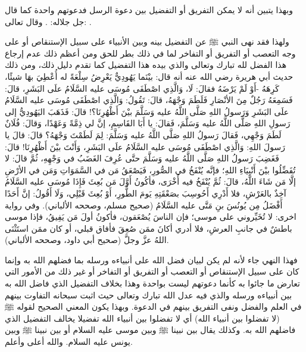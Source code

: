وبهذا يتبين أنه لا يمكن التفريق أو التفضيل بين دعوة الرسل فدعوتهم واحدة كما قال جل جلاله: \quranayah*[2][136]{\footnotesize \surahname*[2]}. وقال تعالى:
\quranayah*[2][285]{\footnotesize \surahname*[2]}.

ولهذا فقد نهى النبي ﷺ عن التفضيل بينه وبين الأنبياء على سبيل الإستنقاص أو على وجه التعصب أو التفريق أو التفاخر لما في ذلك بطر للحق ومن أعظم ذلك عدم إرجاع هذا الفضل لله تبارك وتعالى والذي بيده هذا التفضيل كما تقدم دليل ذلك، ومن ذلك حديث أبي هريرة رضي الله عنه أنه قال: بيْنَما يَهُودِيٌّ يَعْرِضُ سِلْعَةً له أُعْطِيَ بهَا شيئًا، كَرِهَهُ -أَوْ لَمْ يَرْضَهُ فقالَ: لَا، وَالَّذِي اصْطَفَى مُوسَى عليه السَّلَامُ علَى البَشَرِ، قالَ: فَسَمِعَهُ رَجُلٌ مِنَ الأنْصَارِ فَلَطَمَ وَجْهَهُ، قالَ: تَقُولُ: وَالَّذِي اصْطَفَى مُوسَى عليه السَّلَامُ علَى البَشَرِ وَرَسولُ اللهِ صَلَّى اللَّهُ عليه وَسَلَّمَ بيْنَ أَظْهُرِنَا؟! قالَ: فَذَهَبَ اليَهُودِيُّ إلى رَسولِ اللهِ صَلَّى اللَّهُ عليه وَسَلَّمَ، فَقالَ: يا أَبَا القَاسِمِ، إنَّ لي ذِمَّةً وَعَهْدًا، وَقالَ: فُلَانٌ لَطَمَ وَجْهِي، فَقالَ رَسولُ اللهِ صَلَّى اللَّهُ عليه وَسَلَّمَ: لِمَ لَطَمْتَ وَجْهَهُ؟ قالَ: قالَ يا رَسولَ اللهِ: وَالَّذِي اصْطَفَى مُوسَى عليه السَّلَامُ علَى البَشَرِ، وَأَنْتَ بيْنَ أَظْهُرِنَا! قالَ: فَغَضِبَ رَسولُ اللهِ صَلَّى اللَّهُ عليه وَسَلَّمَ حتَّى عُرِفَ الغَضَبُ في وَجْهِهِ، ثُمَّ قالَ: لا تُفَضِّلُوا بيْنَ أَنْبِيَاءِ اللهِ؛ فإنَّه يُنْفَخُ في الصُّورِ، فَيَصْعَقُ مَن في السَّمَوَاتِ وَمَن في الأرْضِ إلَّا مَن شَاءَ اللَّهُ، قالَ: ثُمَّ يُنْفَخُ فيه أُخْرَى، فأكُونُ أَوَّلَ مَن بُعِثَ فَإِذَا مُوسَى عليه السَّلَامُ آخِذٌ بالعَرْشِ، فلا أَدْرِي أَحُوسِبَ بصَعْقَتِهِ يَومَ الطُّورِ، أَوْ بُعِثَ قَبْلِي، وَلَا أَقُولُ: إنَّ أَحَدًا أَفْضَلُ مِن يُونُسَ بنِ مَتَّى عليه السَّلَامُ {\footnotesize (صحيح مسلم، وصححه الألباني)}. وفي رواية اخرى: لا تُخَيِّروني على موسى؛ فإن الناسَ يُصْعَقون، فأكونُ أولَ مَن يَفِيقُ، فإذا موسى باطشٌ في جانبِ العرشِ، فلا أدري أكانَ ممَن صُعِقَ فأفاق قبلي، أو كان ممَن استَثْنَى اللهُ عزَّ وجلَّ {\footnotesize (صحيح أبي داود، وصححه الألباني)}. 

فهذا النهي جاء لأنه لم يكن لبيان فضل الله على أنبياءه ورسله بما فضلهم الله به وإنما كان على سبيل الإستنقاص أو التعصب أو التفريق أو التفاخر أو غير ذلك من الأمور التي تعارض ما جائوا به كأنما دعوتهم ليست بواحدة وهذا بخلاف التفضيل الذي فاضل الله به بين أنبياءه ورسله والذي فيه عدل الله تبارك وتعالى حيث اثبت سبحانه التفاوت بينهم في العلم والفضل ونفى التفريق بينهم في الدعوة. وبهذا يكون المعني الصحيح لقوله ﷺ (لا تفضلوا بين أنبياء الله) أي لا تفضلوا بين أنبياء الله تفضيلا يخالف التفضيل الذي فاضلهم الله به. وكذلك يقال بين نبينا ﷺ وبين موسى عليه السلام أو بين نبينا ﷺ وبين يونس عليه السلام. والله أعلى وأعلم.

